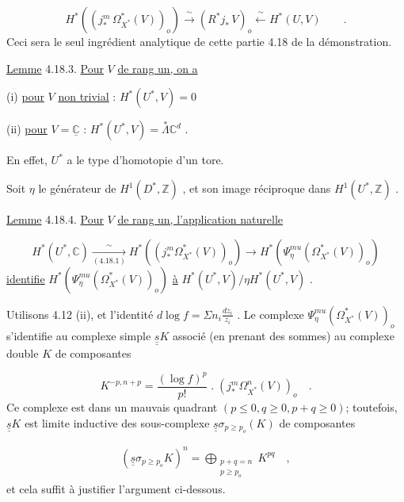 \begin{equation}\tag{4.18.2}
H^*((j_*^m\, \Omega^*_{X^*}(V))_o) \xrightarrow{\ \sim\ } (R^*j_*\, V)_o \xleftarrow{\ \sim\ } H^*(U, V) \qquad .
\end{equation}
Ceci sera le seul ingrédient analytique de cette partie 4.18 de la démonstration.

\underline{Lemme} 4.18.3. \underline{Pour} $V$ \underline{de rang un, on a}

(i) \qquad \underline{pour} $V$ \underline{non trivial} : $H^*(U^*, V) = 0$



 (ii) \underline{pour} $V = \underline{\mathbb{C}}$ : $H^*(U^*, V) = \stackrel{*}{\Lambda} \mathbb{C}^d$ .

En effet, $U^*$ a le type d'homotopie d'un tore.

Soit $\eta$ le générateur de $H^1(D^*, \mathbb{Z})$ , et son image réciproque dans $H^1(U^*, \mathbb{Z})$ .

\underline{Lemme} 4.18.4. \underline{Pour} $V$ \underline{de rang un, l'application naturelle}

\begin{equation*}
H^*(U^*, \mathbb{C}) \xrightarrow[(4.18.1)]{\sim} H^*((j^m_* \Omega^*_{X^*}(V))_o) \longrightarrow H^*(\Psi^{mu}_{\eta}(\Omega^*_{X^*}(V))_o)
\end{equation*}
\underline{identifie} $H^*(\Psi^{mu}_{\eta}(\Omega^*_{X^*}(V))_o)$ \underline{à} $H^*(U^*, V)/\eta H^*(U^*, V)$ .

Utilisons 4.12 (ii), et l'identité $d \log f = \Sigma n_i \frac{dz_i}{z_i}$ . Le complexe $\Psi^{mu}_{\eta}(\Omega^*_{X^*}(V))_o$ s'identifie au complexe simple $\underline{\underline{s}} K$ associé (en prenant des sommes) au complexe double $K$ de composantes

\begin{equation*}
K^{-p,n+p} = \frac{(\log f)^p}{p!} \; . \; (j^m_* \Omega^n_{X^*}(V))_o \quad .
\end{equation*}
Ce complexe est dans un mauvais quadrant $(p \leqslant 0, q \geqslant 0, p+q \geqslant 0)$; toutefois, $\underline{\underline{s}} K$ est limite inductive des sous-complexe $\underline{\underline{s}} \sigma_{p \geqslant p_o}(K)$ de composantes

\begin{multline*}
(\underline{\underline{s}} \sigma_{p \geqslant p_o} K)^n = \bigoplus_{\substack{p+q=n \\ p \geqslant p_o}} K^{pq} \quad ,
\end{multline*}
et cela suffit à justifier l'argument ci-dessous.

